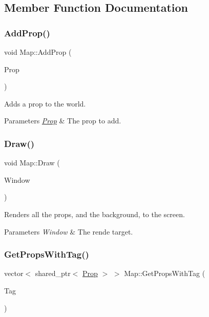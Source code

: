 \subsection{Member Function Documentation}
\mbox{\label{class_map_afc6fdc8687757b818ba754eab7ddd4cb}} 
\subsubsection{\texorpdfstring{Add\+Prop()}{AddProp()}}
{\footnotesize\ttfamily void Map\+::\+Add\+Prop (\begin{DoxyParamCaption}\item[{shared\+\_\+ptr$<$ \hyperlink{class_prop}{Prop} $>$}]{Prop }\end{DoxyParamCaption})}



Adds a prop to the world. 


\begin{DoxyParams}{Parameters}
{\em \hyperlink{class_prop}{Prop}} & The prop to add.\\
\hline
\end{DoxyParams}
\mbox{\label{class_map_ae77582db3c3888918280828f6cc13952}} 
\subsubsection{\texorpdfstring{Draw()}{Draw()}}
{\footnotesize\ttfamily void Map\+::\+Draw (\begin{DoxyParamCaption}\item[{Render\+Window $\ast$}]{Window }\end{DoxyParamCaption})}



Renders all the props, and the background, to the screen. 


\begin{DoxyParams}{Parameters}
{\em Window} & The rende target.\\
\hline
\end{DoxyParams}
\mbox{\label{class_map_a5699a7168473d092a590ee99dff38b3d}} 
\subsubsection{\texorpdfstring{Get\+Props\+With\+Tag()}{GetPropsWithTag()}}
{\footnotesize\ttfamily vector$<$ shared\+\_\+ptr$<$ \hyperlink{class_prop}{Prop} $>$ $>$ Map\+::\+Get\+Props\+With\+Tag (\begin{DoxyParamCaption}\item[{string}]{Tag }\end{DoxyParamCaption})}



